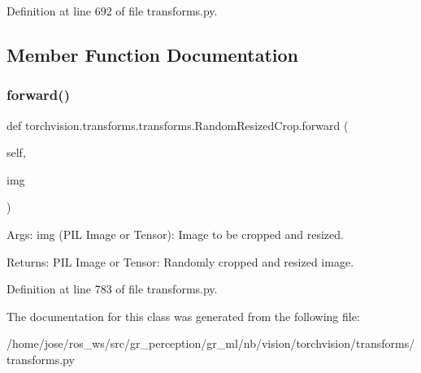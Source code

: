 Definition at line 692 of file transforms.\+py.



\subsection{Member Function Documentation}
\mbox{\label{classtorchvision_1_1transforms_1_1transforms_1_1RandomResizedCrop_a6bb0af34e1a9242416c17831b2b3ef69}} 
\subsubsection{\texorpdfstring{forward()}{forward()}}
{\footnotesize\ttfamily def torchvision.\+transforms.\+transforms.\+Random\+Resized\+Crop.\+forward (\begin{DoxyParamCaption}\item[{}]{self,  }\item[{}]{img }\end{DoxyParamCaption})}

\begin{DoxyVerb}Args:
    img (PIL Image or Tensor): Image to be cropped and resized.

Returns:
    PIL Image or Tensor: Randomly cropped and resized image.
\end{DoxyVerb}
 

Definition at line 783 of file transforms.\+py.



The documentation for this class was generated from the following file\+:\begin{DoxyCompactItemize}
\item 
/home/jose/ros\+\_\+ws/src/gr\+\_\+perception/gr\+\_\+ml/nb/vision/torchvision/transforms/transforms.\+py\end{DoxyCompactItemize}
